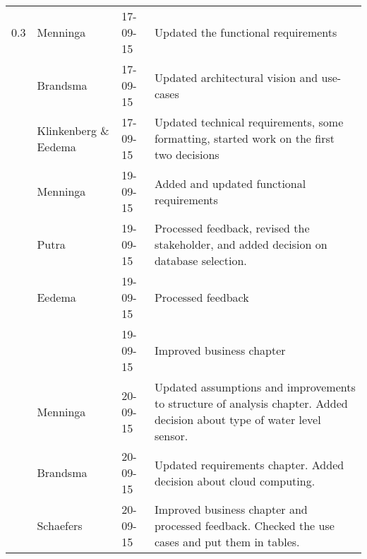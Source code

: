 \begin{longtable}{L{} L{} L{} L{}}
	0.3              & Menninga              & 17-09-15      & Updated the functional requirements                                                                                                                                                                                        \\
	                 & Brandsma              & 17-09-15      & Updated architectural vision and use-cases                                                                                                                                                                                 \\
	                 & Klinkenberg \& Eedema & 17-09-15      & Updated technical requirements, some formatting, started work on the first two decisions                                                                                                                                   \\
	                 & Menninga              & 19-09-15      & Added and updated functional requirements                                                                                                                                                                                  \\
	                 & Putra                 & 19-09-15      & Processed feedback, revised the stakeholder, and added decision on database selection.                                                                                                                                     \\
	                 & Eedema                & 19-09-15      & Processed feedback                                                                                                                                                                                                         \\
	                 &                       & 19-09-15      & Improved business chapter                                                                                                                                                                                                  \\
	                 & Menninga              & 20-09-15      & Updated assumptions and improvements to structure of analysis chapter. Added decision about type of water level sensor.                                                                                                    \\
	                 & Brandsma              & 20-09-15      & Updated requirements chapter. Added decision about cloud computing.                                                                                                                                                        \\
	                 & Schaefers             & 20-09-15      & Improved business chapter and processed feedback. Checked the use cases and put them in tables.                                                                                                                            \\
	                 

\end{longtable}
